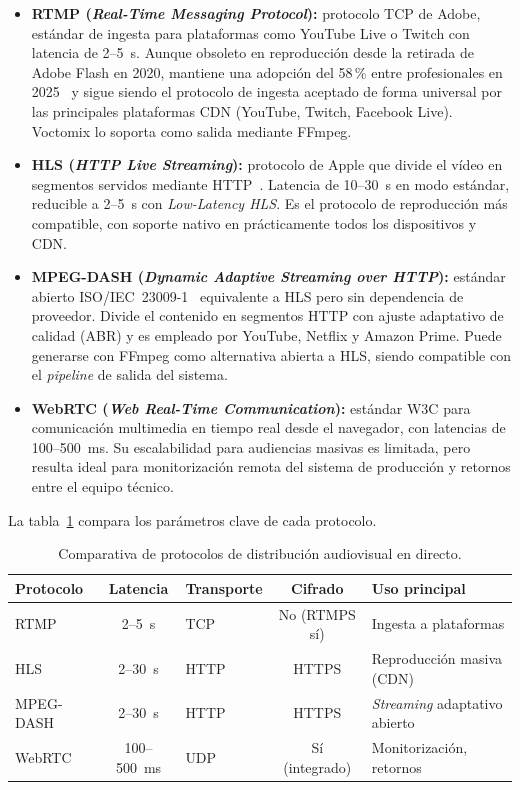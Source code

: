 \begin{itemize}
  \item \textbf{RTMP (\textit{Real-Time Messaging Protocol}):} protocolo TCP de Adobe,
  estándar de ingesta para plataformas como YouTube Live o Twitch con latencia de
  2--5~s. Aunque obsoleto en reproducción desde la retirada de Adobe Flash en 2020,
  mantiene una adopción del 58\,\% entre profesionales en
  2025~\cite{haivision_broadcast_report_2025} y sigue siendo el protocolo de ingesta
  aceptado de forma universal por las principales plataformas \ac{CDN} (YouTube, Twitch,
  Facebook Live). Voctomix lo soporta como salida mediante FFmpeg.

  \item \textbf{HLS (\textit{HTTP Live Streaming}):} protocolo de Apple que divide el
  vídeo en segmentos servidos mediante HTTP~\cite{rfc8216}. Latencia de 10--30~s en
  modo estándar, reducible a 2--5~s con \textit{Low-Latency HLS}. Es el protocolo de
  reproducción más compatible, con soporte nativo en prácticamente todos los dispositivos
  y CDN.

  \item \textbf{MPEG-DASH (\textit{Dynamic Adaptive Streaming over HTTP}):} estándar
  abierto ISO/IEC~23009-1~\cite{iso_mpegdash} equivalente a HLS pero sin dependencia de
  proveedor. Divide el contenido en segmentos HTTP con ajuste adaptativo de calidad
  (\ac{ABR}) y es empleado por YouTube, Netflix y Amazon Prime. Puede generarse con FFmpeg
  como alternativa abierta a HLS, siendo compatible con el \textit{pipeline} de salida del sistema.

  \item \textbf{WebRTC (\textit{Web Real-Time Communication}):} estándar W3C para
  comunicación multimedia en tiempo real desde el navegador, con latencias de
  100--500~ms. Su escalabilidad para audiencias masivas es limitada, pero resulta ideal
  para monitorización remota del sistema de producción y retornos entre el equipo técnico.
\end{itemize}

La tabla~\ref{tab:distribucion_protocolos} compara los parámetros clave de cada protocolo.

\begin{table}[H]
  \centering
  \caption{Comparativa de protocolos de distribución audiovisual en directo.}
  \label{tab:distribucion_protocolos}
  \small
  \begin{tabularx}{\textwidth}{|l|c|l|c|X|}
    \hline
    \textbf{Protocolo} & \textbf{Latencia} & \textbf{Transporte} & \textbf{Cifrado} & \textbf{Uso principal} \\
    \hline
    RTMP      & 2--5~s      & TCP    & No (RTMPS sí) & Ingesta a plataformas \\
    HLS       & 2--30~s     & HTTP   & HTTPS         & Reproducción masiva (CDN) \\
    MPEG-DASH & 2--30~s     & HTTP   & HTTPS         & \textit{Streaming} adaptativo abierto \\
    WebRTC    & 100--500~ms & UDP    & Sí (integrado) & Monitorización, retornos \\
    \hline
  \end{tabularx}
\end{table}

